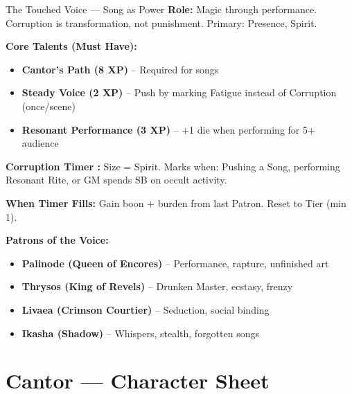 \documentclass[10pt]{article}
\begin{document}
\begin{tipbox}{The Touched Voice --- Song as Power}
    \textbf{Role:} Magic through performance. Corruption is transformation, not punishment. Primary: Presence, Spirit.
    
    \textbf{Core Talents (Must Have):}
    \begin{itemize}
        \item \textbf{Cantor's Path (8 XP)} -- Required for songs
        \item \textbf{Steady Voice (2 XP)} -- Push by marking Fatigue instead of Corruption (once/scene)
        \item \textbf{Resonant Performance (3 XP)} -- +1 die when performing for 5+ audience
    \end{itemize}
    
    \textbf{Corruption Timer :} Size = Spirit. Marks when: Pushing a Song, performing Resonant Rite, or GM spends SB on occult activity.
    
    \textbf{When Timer Fills:} Gain boon + burden from last Patron. Reset to Tier (min 1).
    
    \textbf{Patrons of the Voice:}
    \begin{itemize}
        \item \textbf{Palinode (Queen of Encores)} -- Performance, rapture, unfinished art
        \item \textbf{Thrysos (King of Revels)} -- Drunken Master, ecstasy, frenzy
        \item \textbf{Livaea (Crimson Courtier)} -- Seduction, social binding
        \item \textbf{Ikasha (Shadow)} -- Whispers, stealth, forgotten songs
    \end{itemize}
\end{tipbox}

\newpage

\section*{Cantor --- Character Sheet}
\end{document}
